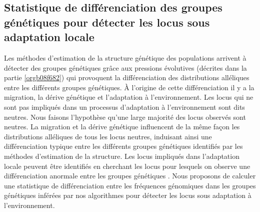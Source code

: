 \documentclass[12pt,a4paper,twoside]{ugathesis}
\begin{document}
\subsection{Statistique de différenciation des groupes génétiques pour détecter les locus sous adaptation locale}
\label{sec:org0d417cd}

Les méthodes d'estimation de la structure génétique des populations arrivent à
détecter des groupes génétiques grâce aux pressions évolutives (décrites dans
la partie \ref{orgb08f682}) qui provoquent la différenciation des distributions
alléliques entre les différents groupes génétiques. À l'origine de cette
différenciation il y a la migration, la dérive génétique et l'adaptation à
l'environnement. Les locus qui ne sont pas impliqués dans un processus
d'adaptation à l'environnement sont dits neutres. Nous faisons l'hypothèse
qu'une large majorité des locus observés sont neutres. La migration et la dérive
génétique influencent de la même façon les distributions alléliques de tous les
locus neutres, induisant ainsi une différenciation typique entre les différents
groupes génétiques identifiés par les méthodes d'estimation de la structure.
Les locus impliqués dans l'adaptation locale peuvent être identifiés en
cherchant les locus pour lesquels on observe une différenciation anormale entre
les groupes génétiques \citep{Lewontin175}. Nous proposons de calculer une
statistique de différenciation entre les fréquences génomiques dans les groupes
génétiques inférées par nos algorithmes pour détecter les locus sous adaptation
à l'environnement.
\end{document}
